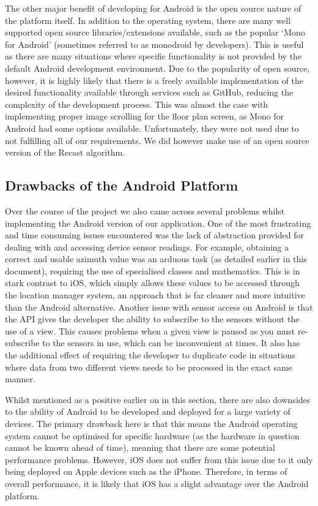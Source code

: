 \documentclass[12pt,a4paper]{report}
\begin{document}
The other major benefit of developing for Android is the open source nature of the platform itself. In addition to the operating system, there are many well supported open source libraries/extensions available, such as the popular `Mono for Android' (sometimes referred to as monodroid by developers). This is useful as there are many situations where specific functionality is not provided by the default Android development environment. Due to the popularity of open  source, however, it is highly likely that there is a freely available implementation of the desired functionality available through services such as GitHub, reducing the complexity of the development process. This was almost the case with implementing proper image scrolling for the floor plan screen, as Mono for Android had some options available. Unfortunately, they were not used due to not fulfilling all of our requirements. We did however make use of an open source version of the Recast algorithm.
       
 \subsection{Drawbacks of the Android Platform}
Over the course of the project we also came across several problems whilst implementing the Android version of our application. One of the most frustrating and time consuming issues encountered was the lack of abstraction provided for dealing with and accessing device sensor readings. For example, obtaining a correct and usable azimuth value was an arduous task (as detailed earlier in this document), requiring the use of specialised classes and mathematics. This is in stark contrast to iOS, which simply allows these values to be accessed through the location manager system, an approach that is far cleaner and more intuitive than the Android alternative. Another issue with sensor access on Android is that the API gives the developer the ability to subscribe to the sensors without the use of a view. This causes problems when a given view is paused as you must re-subscribe to the sensors in use, which can be inconvenient at times. It also has the additional effect of requiring the developer to duplicate code in situations where data from two different views needs to be processed in the exact same manner.
            
Whilst mentioned as a positive earlier on in this section, there are also downsides to the ability of Android to be developed and deployed for a large variety of devices. The primary drawback here is that this means the Android operating system cannot be optimised for specific hardware (as the hardware in question cannot be known ahead  of time), meaning that there are some potential performance problems. However, iOS does not suffer from this issue due to it only being deployed on Apple devices such as the iPhone. Therefore, in terms of overall performance, it is likely that iOS has a slight advantage over the Android platform.
            
\end{document}
